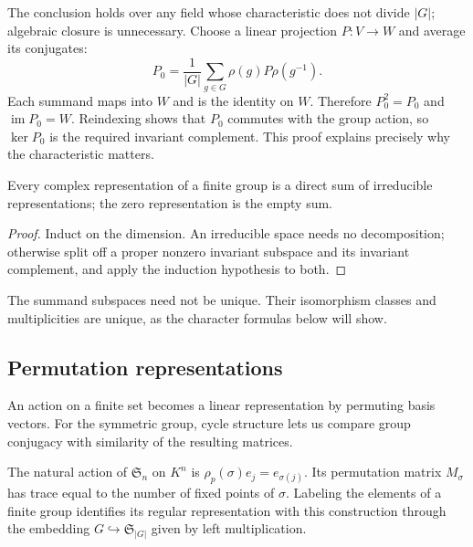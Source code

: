 \begin{rem}
The conclusion holds over any field whose characteristic does not divide
$|G|$; algebraic closure is unnecessary. Choose a linear projection
$P:V\to W$ and average its conjugates:
\[
 P_0=\frac1{|G|}\sum_{g\in G}\rho(g)P\rho(g^{-1}).
\]
Each summand maps into $W$ and is the identity on $W$. Therefore
$P_0^2=P_0$ and $\operatorname{im}P_0=W$. Reindexing shows that $P_0$
commutes with the group action, so $\ker P_0$ is the required invariant
complement. This proof explains precisely why the characteristic matters.
\end{rem}


\begin{prop}
\label{prop-decomposition-irreducible-sum}
Every complex representation of a finite group is a direct sum of
irreducible representations; the zero representation is the empty sum.
\end{prop}
\begin{proof}
Induct on the dimension. An irreducible space needs no decomposition;
otherwise split off a proper nonzero invariant subspace and its invariant
complement, and apply the induction hypothesis to both.
\end{proof}


\begin{rem}[Uniqueness]
\label{rmk-unique-writing}
The summand subspaces need not be unique. Their isomorphism classes and
multiplicities are unique, as the character formulas below will show.
\end{rem}

\subsection{Permutation representations}
\label{sect2-symmetric-group}

An action on a finite set becomes a linear representation by permuting basis
vectors. For the symmetric group, cycle structure lets us compare group
conjugacy with similarity of the resulting matrices.

The natural action of $\mathfrak S_n$ on $K^n$ is
$\rho_p(\sigma)e_j=e_{\sigma(j)}$. Its permutation matrix $M_\sigma$
has trace equal to the number of fixed points of $\sigma$. Labeling the
elements of a finite group identifies its regular representation with
this construction through the embedding $G\hookrightarrow\mathfrak S_{|G|}$
given by left multiplication.

